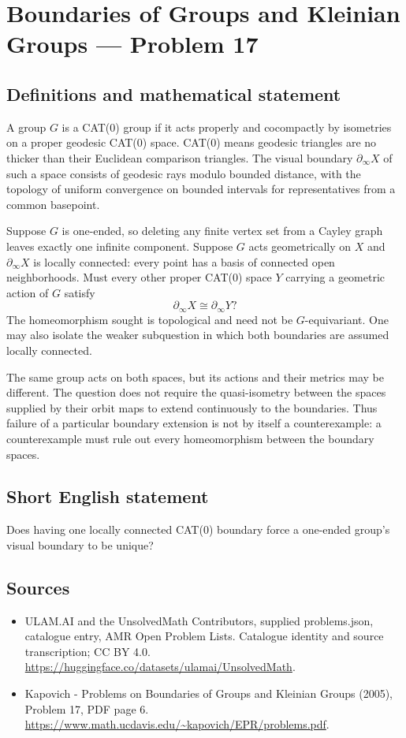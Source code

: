 \documentclass[11pt,a4paper]{article}
\begin{document}
\section*{Boundaries of Groups and Kleinian Groups — Problem 17}\label{statement}

\subsection{Definitions and mathematical statement}
A group $G$ is a CAT(0) group if it acts properly and cocompactly by isometries on a proper geodesic CAT(0) space. CAT(0) means geodesic triangles are no thicker than their Euclidean comparison triangles. The visual boundary $\partial_\infty X$ of such a space consists of geodesic rays modulo bounded distance, with the topology of uniform convergence on bounded intervals for representatives from a common basepoint.

Suppose $G$ is one-ended, so deleting any finite vertex set from a Cayley graph leaves exactly one infinite component. Suppose $G$ acts geometrically on $X$ and $\partial_\infty X$ is locally connected: every point has a basis of connected open neighborhoods. Must every other proper CAT(0) space $Y$ carrying a geometric action of $G$ satisfy
\[
 \partial_\infty X\cong\partial_\infty Y?
\]
The homeomorphism sought is topological and need not be $G$-equivariant. One may also isolate the weaker subquestion in which both boundaries are assumed locally connected.

The same group acts on both spaces, but its actions and their metrics may be different. The question does not require the quasi-isometry between the spaces supplied by their orbit maps to extend continuously to the boundaries. Thus failure of a particular boundary extension is not by itself a counterexample: a counterexample must rule out every homeomorphism between the boundary spaces.
\subsection{Short English statement}
Does having one locally connected CAT(0) boundary force a one-ended group’s visual boundary to be unique?
\subsection{Sources}
\begin{itemize}
\item[S1] ULAM.AI and the UnsolvedMath Contributors, supplied problems.json, catalogue entry, AMR Open Problem Lists. Catalogue identity and source transcription; CC BY 4.0.
\url{https://huggingface.co/datasets/ulamai/UnsolvedMath}.
\item[S2] Kapovich - Problems on Boundaries of Groups and Kleinian Groups (2005), Problem 17, PDF page 6. 
\url{https://www.math.ucdavis.edu/~kapovich/EPR/problems.pdf}.
\end{itemize}
\end{document}
